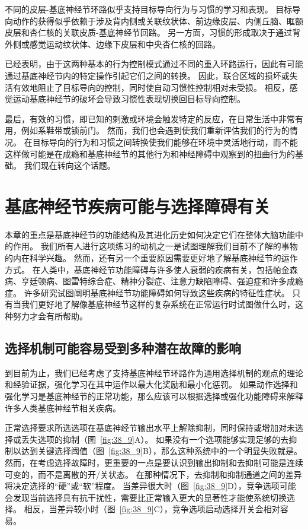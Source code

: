 不同的皮层-基底神经节环路似乎支持目标导向行为与习惯的学习和表现。
目标导向动作的获得似乎依赖于涉及背内侧或关联纹状体、前边缘皮层、内侧丘脑、眶额皮层和杏仁核的关联皮质-基底神经节回路。
另一方面，习惯的形成取决于通过背外侧或感觉运动纹状体、边缘下皮层和中央杏仁核的回路。


已经表明，由于这两种基本的行为控制模式通过不同的重入环路运行，因此有可能通过基底神经节内的特定操作引起它们之间的转换。
因此，联合区域的损坏或失活有效地阻止了目标导向的控制，同时使自动习惯性控制相对未受损。
相反，感觉运动基底神经节的破坏会导致习惯性表现切换回目标导向控制。


最后，有效的习惯，即已知的刺激或环境会触发特定的反应，在日常生活中非常有用，例如系鞋带或锁前门。
然而，我们也会遇到使我们重新评估我们的行为的情况。
在目标导向的行为和习惯之间转换使我们能够在环境中灵活地行动，而不能这样做可能是在成瘾和基底神经节的其他行为和神经障碍中观察到的扭曲行为的基础。
我们现在转向这个话题。



\section{基底神经节疾病可能与选择障碍有关}

本章的重点是基底神经节的功能结构及其进化历史如何决定它们在整体大脑功能中的作用。
我们所有人进行这项练习的动机之一是试图理解我们目前不了解的事物的内在科学兴趣。
然而，还有另一个重要原因需要更好地了解基底神经节的运作方式。
在人类中，基底神经节功能障碍与许多使人衰弱的疾病有关，包括帕金森病、亨廷顿病、图雷特综合症、精神分裂症、注意力缺陷障碍、强迫症和许多成瘾症。
许多研究试图阐明基底神经节功能障碍如何导致这些疾病的特征性症状。
只有当我们更好地了解像基底神经节这样的复杂系统在正常运行时试图做什么时，这种努力才会有所帮助。



\subsection{选择机制可能容易受到多种潜在故障的影响}

到目前为止，我们已经考虑了支持基底神经节环路作为通用选择机制的观点的理论和经验证据，强化学习在其中运作以最大化奖励和最小化惩罚。
如果动作选择和强化学习是基底神经节的正常功能，那么应该可以根据选择或强化功能障碍来解释许多人类基底神经节相关疾病。


正常选择要求所选选项在基底神经节输出水平上解除抑制，同时保持或增加对未选择或丢失选项的抑制（图~\ref{fig:38_9}A）。
如果没有一个选项能够实现足够的去抑制以达到关键选择阈值（图~\ref{fig:38_9}B），那么这种系统中的一个明显失败就是。
然而，在考虑选择故障时，更重要的一点是要认识到输出抑制和去抑制可能是连续可变的，而不是离散的开/关状态。
在那种情况下，去抑制和抑制通道之间的差异将决定选择的“硬”或“软”程度。
当差异很大时（图~\ref{fig:38_9}D），竞争选项可能会发现当前选择具有抗干扰性，需要比正常输入更大的显著性才能使系统切换选择。
相反，当差异较小时（图~\ref{fig:38_9}C），竞争选项启动选择开关会相对容易。


